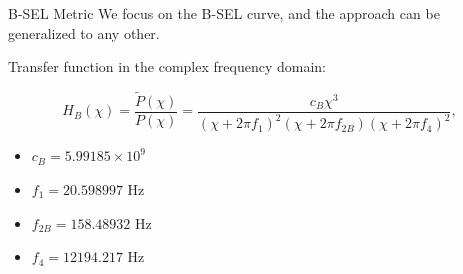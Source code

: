 \documentclass{beamer}
\newcounter{sectionframecount}
\begin{document}
\begin{frame}[t]{B-SEL Metric}
\vspace{-10pt}
We focus on the B-SEL curve, and the approach can be generalized to any other.

{
\vspace{10pt}
Transfer function in the complex frequency domain:

\begin{equation}
  H_B(\chi) =\dfrac{\tilde{P}(\chi)}{P(\chi)} = \dfrac{c_B \chi^3}{(\chi+2\pi f_1)^2(\chi+2\pi f_{2B})(\chi+2\pi f_4)^2},
  \label{e:continuous_transfer}
\end{equation}
}

{
\vspace{10pt}
\begin{itemize}
  \item $c_B = 5.99185 \times 10^9$
  \item $f_1 = 20.598997$ Hz
  \item $f_{2B} = 158.48932$ Hz
  \item $f_4 = 12194.217$ Hz
\end{itemize}

}
\end{frame}

\end{document}
